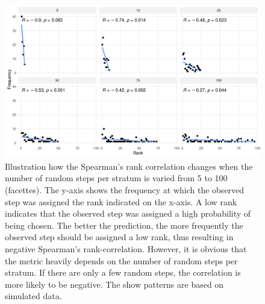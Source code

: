 \documentclass[../FinalThesis.tex]{subfiles}
\begin{document}
\begin{figure}[htpb]
 \begin{center}
  \includegraphics[width = \textwidth]{Figures/RankCorrelationNumberSteps.png}
  \caption{Illustration how the Spearman's rank correlation changes when the
  number of random steps per stratum is varied from 5 to 100 (facettes). The
  y-axis shows the frequency at which the observed step was assigned the rank
  indicated on the x-axis. A low rank indicates that the observed step was
  assigned a high probability of being chosen. The better the prediction, the
  more frequently the observed step should be assigned a low rank, thus
  resulting in negative Spearman's rank-correlation. However, it is obvious that
  the metric heavily depends on the number of random steps per stratum. If there
  are only a few random steps, the correlation is more likely to be negative.
  The show patterns are based on simulated data.}
  \label{RankCorrelationNumberSteps}
 \end{center}
\end{figure}

\end{document}

